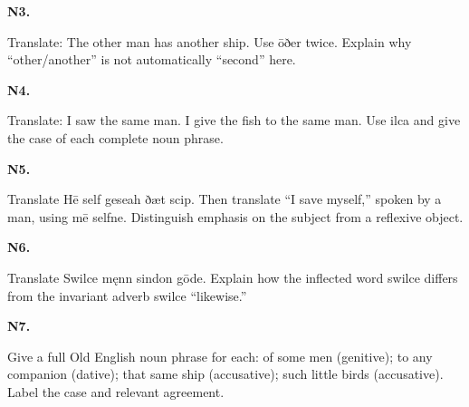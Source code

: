 \par\begin{minipage}{\linewidth}\raggedright
\textbf{N3.}

Translate: The other man has another ship. Use ōðer twice. Explain why “other/\allowbreak{}another” is not automatically “second” here.

\end{minipage}\par\addvspace{4pt}

\par\begin{minipage}{\linewidth}\raggedright
\textbf{N4.}

Translate: I saw the same man. I give the fish to the same man. Use ilca and give the case of each complete noun phrase.

\end{minipage}\par\addvspace{4pt}

\par\begin{minipage}{\linewidth}\raggedright
\textbf{N5.}

Translate Hē self geseah ðæt scip. Then translate “I save myself,” spoken by a man, using mē selfne. Distinguish emphasis on the subject from a reflexive object.

\end{minipage}\par\addvspace{4pt}

\par\begin{minipage}{\linewidth}\raggedright
\textbf{N6.}

Translate Swilce męnn sindon gōde. Explain how the inflected word swilce differs from the invariant adverb swilce “likewise.”

\end{minipage}\par\addvspace{4pt}

\par\begin{minipage}{\linewidth}\raggedright
\textbf{N7.}

Give a full Old English noun phrase for each: of some men (genitive); to any companion (dative); that same ship (accusative); such little birds (accusative). Label the case and relevant agreement.

\end{minipage}\par\addvspace{4pt}

